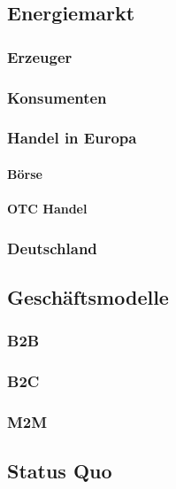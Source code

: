 \subsection{Energiemarkt}

\subsubsection{Erzeuger}

\subsubsection{Konsumenten}

\subsubsection{Handel in Europa}

\paragraph{Börse}

\paragraph{OTC Handel}

\subsubsection{Deutschland}

\subsection{Geschäftsmodelle}

\subsubsection{B2B}

\subsubsection{B2C}

\subsubsection{M2M}

\subsection{Status Quo}

